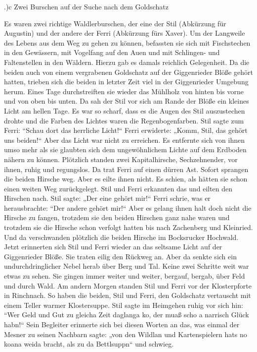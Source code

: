 \documentclass{book}
\begin{document}
.)c Zwei Burschen auf der Suche nach dem Goldschatz

Es waren zwei richtige Waldlerburschen, der eine der Stil (Abkürzung für
Augustin) und der andere der Ferri (Abkürzung fürs Xaver). Um der Langweile des
Lebens aus dem Weg zu gehen zu können, befassten sie sich mit Fischstechen in
den Gewässern, mit Vogelfang auf den Auen und mit Schlingen- und Faltenstellen
in den Wäldern. Hierzu gab es damals reichlich Gelegenheit. Da die beiden auch
von einem vergrabenen Goldschatz auf der Giggenrieder Blöße gehört hatten,
trieben sich die beiden in letzter Zeit viel in der Giggenrieder Umgebung herum.
Eines Tage durchstreiften sie wieder das Mühlholz von hinten bis vorne und von
oben bis unten. Da sah der Stil vor sich am Rande der Blöße ein kleines Licht am
hellen Tage. Es war so scharf, dass es die Augen des Stil auszustechen drohte
und die Farben des Lichtes waren die Regenbogenfarben. Stil sagte zum Ferri:
“Schau dort das herrliche Licht!“ Ferri erwiderte: „Komm, Stil, das gehört uns
beiden!“ Aber das Licht war nicht zu erreichen. Es entfernte sich von ihnen umso
mehr als sie glaubten sich dem ungewöhnlichem Lichte auf dem Erdboden nähern zu
können. Plötzlich standen zwei Kapitalhirsche, Sechzehnender, vor ihnen, ruhig
und regungslos. Da trat Ferri auf einen dürren Ast. Sofort sprangen die beiden
Hirsche weg. Aber es eilte ihnen nicht. Es schien, als hätten sie schon einen
weiten Weg zurückgelegt. Stil und Ferri erkannten das und eilten den Hirschen
nach. Stil sagte: „Der eine gehört mir!“ Ferri schrie, was er herausbrachte:
“Der andere gehört mir!“ Aber es gelang ihnen halt doch nicht die Hirsche zu
fangen, trotzdem sie den beiden Hirschen ganz nahe waren und trotzdem sie die
Hirsche schon verfolgt hatten bis nach Zachenberg und Kleinried. Und da
verschwanden plötzlich die beiden Hirsche im Bocksrucker Hochwald. Jetzt
erinnerten sich Stil und Ferri wieder an das seltsame Licht auf der Giggenrieder
Blöße. Sie traten eilig den Rückweg an. Aber da senkte sich ein
undurchdringlicher Nebel herab über Berg und Tal. Keine zwei Schritte weit war
etwas zu sehen. Sie gingen immer weiter und weiter, bergauf, bergab, über Feld
und durch Wald. Am andern Morgen standen Stil und Ferri vor der Klosterpforte in
Rinchnach. So haben die beiden, Stil und Ferri, den Goldschatz vertauscht mit
einem Teller warmer Klostersuppe. Stil sagte im Heimgehen ruhig vor sich hin:
“Wer Geld und Gut zu gleicha Zeit daglanga ko, der muaß scho a narrisch Glück
habn!“ Sein Begleiter erinnerte sich bei diesen Worten an das, was einmal der
Mesner zu seinen Nachbarn sagte: „von den Wildlan und Kartenspielern hats no
koana weida bracht, als zu da Bettlsuppn“ und schwieg.
\end{document}
